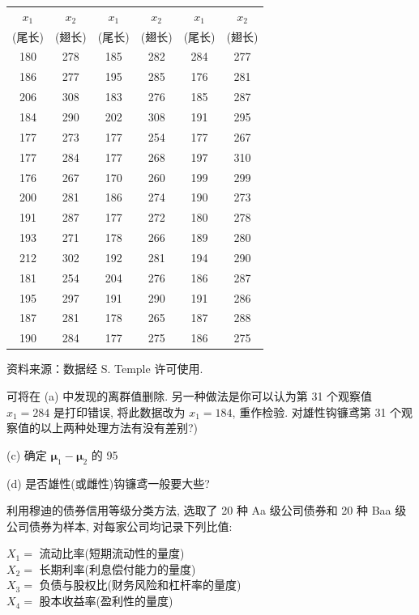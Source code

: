 
\begin{mvtable}
\label{tab:6.11}
\begin{tabular}{cc|cc|cc}
\toprule
$x_{1}$ & $x_{2}$ & $x_{1}$ & $x_{2}$ & $x_{1}$ & $x_{2}$ \\
(尾长) & (翅长) & (尾长) & (翅长) & (尾长) & (翅长) \\
\midrule
180 & 278 & 185 & 282 & 284 & 277 \\
186 & 277 & 195 & 285 & 176 & 281 \\
206 & 308 & 183 & 276 & 185 & 287 \\
184 & 290 & 202 & 308 & 191 & 295 \\
177 & 273 & 177 & 254 & 177 & 267 \\
177 & 284 & 177 & 268 & 197 & 310 \\
176 & 267 & 170 & 260 & 199 & 299 \\
200 & 281 & 186 & 274 & 190 & 273 \\
191 & 287 & 177 & 272 & 180 & 278 \\
193 & 271 & 178 & 266 & 189 & 280 \\
212 & 302 & 192 & 281 & 194 & 290 \\
181 & 254 & 204 & 276 & 186 & 287 \\
195 & 297 & 191 & 290 & 191 & 286 \\
187 & 281 & 178 & 265 & 187 & 288 \\
190 & 284 & 177 & 275 & 186 & 275 \\
\bottomrule
\end{tabular}
\end{mvtable}

{ 资料来源：数据经 S. Temple 许可使用.}

可将在 (a) 中发现的离群值删除. 另一种做法是你可以认为第 31 个观察值 $x_{1}=284$ 是打印错误, 将此数据改为 $x_{1}=184$, 重作检验. 对雄性钩镰鸢第 31 个观察值的以上两种处理方法有没有差别?)

(c) 确定 $\boldsymbol{\mu}_{1}-\boldsymbol{\mu}_{2}$ 的 95%

(d) 是否雄性(或雌性)钩镰鸢一般要大些?

\medskip
{}\quad 利用穆迪的债券信用等级分类方法, 选取了 20 种 Aa 级公司债券和 20 种 Baa 级公司债券为样本, 对每家公司均记录下列比值:

$X_{1}=$ 流动比率(短期流动性的量度)\\
$X_{2}=$ 长期利率(利息偿付能力的量度)\\
$X_{3}=$ 负债与股权比(财务风险和杠杆率的量度)\\
$X_{4}=$ 股本收益率(盈利性的量度)

